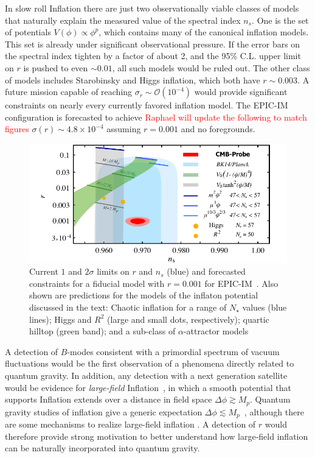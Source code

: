 In slow roll Inflation there are just two observationally viable classes of models that naturally explain the measured value of the spectral index $n_s$. 
One is the set of potentials $V(\phi)\propto\phi^p$, which contains many of the canonical inflation models. This 
set is already under significant observational pressure. If the error bars on the spectral index tighten by a factor of about 2, 
and the 95\% C.L. upper limit on $r$ is pushed to even $\sim0.01$, all such models would be ruled out. 
The other class of models includes Starobinsky and Higgs inflation, which both have $r\sim0.003$. A future mission 
capable of reaching $\sigma_r\sim\mathcal{O}(10^{-4})$ would provide significant constraints on nearly every currently favored 
inflation model. The EPIC-IM configuration is forecasted to achieve \textcolor{red}{Raphael will update the following to match figures} $\sigma(r)\sim4.8 \times 10^{-4}$ assuming $r=0.001$ 
and no foregrounds.
\begin{figure}[ht!]
\parbox{4.in}{\centerline {
\includegraphics[width=4.5in]{figs/nsrlabeledrp001v2} } }
\hspace{-0.05in}
\parbox{2.5in}{
\caption{ \small \setlength{\baselineskip}{0.95\baselineskip}
Current $1$ and $2\sigma $ limits on $r$ and $n_{s}$ (blue) and forecasted constraints for a fiducial model with $r=0.001$ for 
EPIC-IM~\cite{Array:2015xqh}. Also shown are predictions 
for the models of the inflaton potential discussed in the text: Chaotic inflation for a range of $N_\star$ values (blue lines); 
Higgs and $R^2$ (large and small dots, respectively);  quartic hilltop (green band); and a sub-class of $\alpha$-attractor
models~\cite{Kallosh:2013hoa}
\label{fig:nsrp001} } }
\vspace{-0.1in}
\end{figure}

A detection of $B$-modes consistent with a primordial spectrum of vacuum fluctuations would be the first observation 
of a phenomena directly related to quantum gravity. In addition, any detection with a next generation satellite would be 
evidence for {\it large-field} Inflation~\cite{Lyth:1996im}, in which a smooth potential that supports Inflation extends over 
a distance in field space $\Delta\phi \gtrsim M_p$. Quantum gravity studies of inflation give a generic 
expectation $\Delta\phi \lesssim M_p$~\cite{Banks:2003sx,Baumann:2014nda,Brown:2015iha,Rudelius:2015xta}, although 
there are some mechanisms to realize large-field inflation \cite{Silverstein:2008sg,Kaloper:2008fb,Marchesano:2014mla,Blumenhagen:2015xpa}. 
A detection of $r$ would therefore provide strong 
motivation to better understand how large-field inflation can be naturally incorporated into quantum gravity. 

